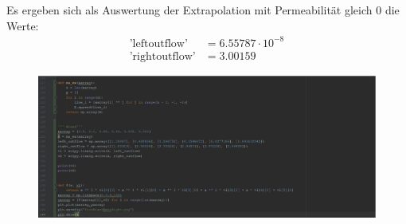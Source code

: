 Es ergeben sich als Auswertung der Extrapolation mit Permeabilität gleich 0 die Werte: 
\begin{align*}
\text{'leftoutflow'} &= 6.55787 \cdot 10^{-8} \\
\text{'rightoutflow'} &= 3.00159
\end{align*}




\begin{figure}[H]
	\centering
	
	\includegraphics[width=\textwidth]{../../19/extrapolation.png}
	
\end{figure}